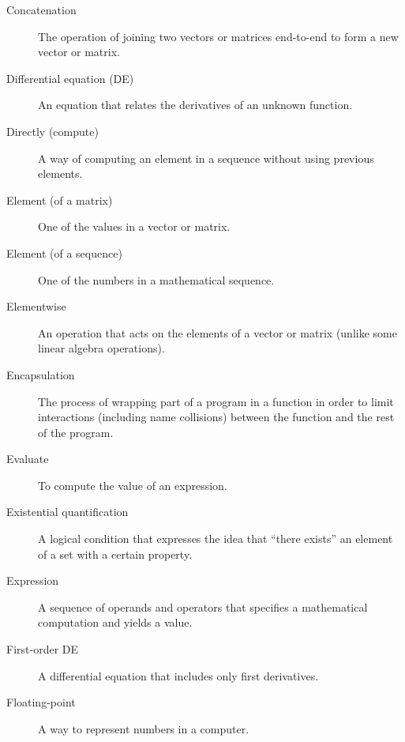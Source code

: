 \begin{description}
\item[Concatenation] The operation of joining two vectors or matrices end-to-end to
form a new vector or matrix.


\item[Differential equation (DE)] An equation that relates the
derivatives of an unknown function.

\item[Directly (compute)] A way of computing an element in a sequence without
using previous elements.



\item[Element (of a matrix)] One of the values in a vector or matrix.

\item[Element (of a sequence)] One of the numbers in a mathematical \mbox{sequence}.

\item[Elementwise] An operation that acts on the elements
of a vector or matrix (unlike some linear algebra operations).

\item[Encapsulation] The process of wrapping part of a program in
a function in order to limit interactions (including name collisions)
between the function and the rest of the program.

\item[Evaluate] To compute the value of an expression.

\item[Existential quantification] A logical condition that expresses the idea that ``there exists'' an element of a set with a certain property.

\item[Expression] A sequence of operands and operators that specifies
a mathematical computation and yields a value.

\item[First-order DE] A differential equation that includes only first derivatives.

\item[Floating-point] A way to represent numbers in a computer.


\end{description}
